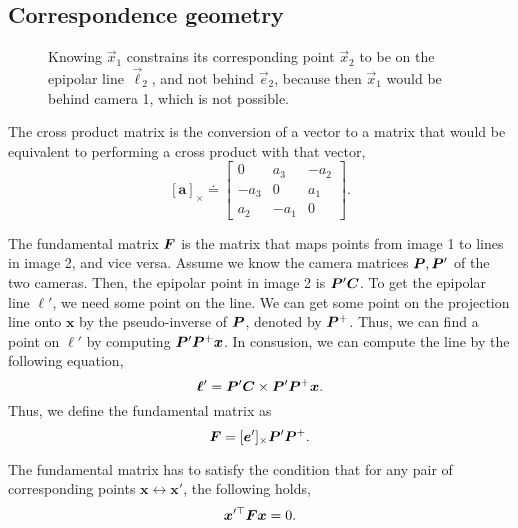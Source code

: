 \subsection{Correspondence geometry}

\begin{figure}[ht]
    \centering
    \caption{Knowing $\vec{x}_1$ constrains its corresponding point $\vec{x}_2$
    to be on the epipolar line $\vec{\ell}_2$, and not behind $\vec{e}_2$,
    because then $\vec{x}_1$ would be behind camera 1, which is not possible.}
    \label{fig:image-1-constraint}
\end{figure}

\begin{definition}
  The cross product matrix is the conversion of a vector to a matrix that
  would be equivalent to performing a cross product with that vector, \[
    [\bm{a}]_\times \doteq \begin{bmatrix}
      0 & a_3 & -a_2 \\
      -a_3 & 0 & a_1 \\
      a_2 & -a_1 & 0
    \end{bmatrix}
  .\]
\end{definition}

The fundamental matrix $\bm{F}$ is the matrix that maps points from image 1
to lines in image 2, and vice versa.
Assume we know the camera matrices $\bm{P},\bm{P}'$ of the two cameras. Then,
the epipolar point in image 2 is $\bm{P}'\bm{C}$. To get the epipolar line
$\bm{\ell}'$, we need some point on the line.  We can get some point on the
projection line onto $\bm{x}$ by the pseudo-inverse of $\bm{P}$, denoted by
$\bm{P}^+$. Thus, we can find a point
on $\bm{\ell}'$ by computing $\bm{P}'\bm{P}^+ \bm{x}$. In consusion, we can
compute the line by the following equation, \[
  \bm{\ell}' = \bm{P}'\bm{C}\times \bm{P}'\bm{P}^+\bm{x}
.\]
Thus, we define the fundamental matrix as \[
  \bm{F} = [\bm{e}']_\times \bm{P}'\bm{P}^+
.\]

The fundamental matrix has to satisfy the condition that for any pair of
corresponding points $\bm{x}\leftrightarrow\bm{x}'$, the following
holds, \[
  \bm{x}'^\top \bm{F}\bm{x} = 0
.\]


